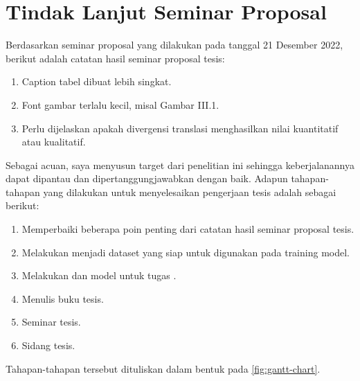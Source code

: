 \chapter{Tindak Lanjut Seminar Proposal}

Berdasarkan seminar proposal yang dilakukan pada tanggal 21 Desember 2022, berikut adalah catatan hasil seminar proposal tesis:

\begin{enumerate}
  \item Caption tabel dibuat lebih singkat.
  \item Font gambar terlalu kecil, misal Gambar III.1.
  \item Perlu dijelaskan apakah divergensi translasi menghasilkan nilai kuantitatif atau kualitatif.
\end{enumerate}

Sebagai acuan, saya menyusun target dari penelitian ini sehingga keberjalanannya dapat dipantau dan dipertanggungjawabkan dengan baik.
Adapun tahapan-tahapan yang dilakukan untuk menyelesaikan pengerjaan tesis adalah sebagai berikut:

\begin{enumerate}
  \item Memperbaiki beberapa poin penting dari catatan hasil seminar proposal tesis.
  \item Melakukan  menjadi dataset yang siap untuk digunakan pada training model.
  \item Melakukan  dan  model untuk tugas \amrparsing{}.
  \item Menulis buku tesis.
  \item Seminar tesis.
  \item Sidang tesis.
\end{enumerate}

Tahapan-tahapan tersebut dituliskan dalam bentuk  pada \cref{fig:gantt-chart}.

